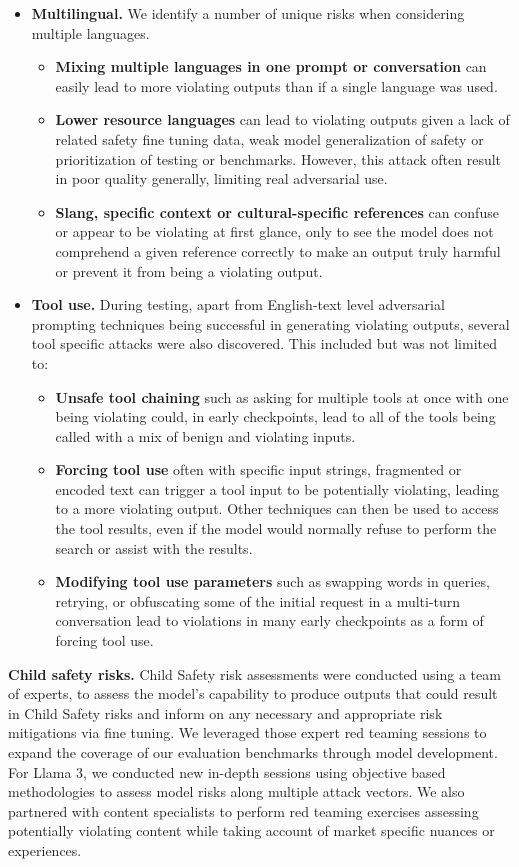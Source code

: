 \documentclass[dvipsnames]{fairmeta}
\begin{document}
\begin{itemize}
    \item \textbf{Multilingual.} We identify a number of unique risks when considering multiple languages.
    \begin{itemize}
        \item \textbf{Mixing multiple languages in one prompt or conversation} can easily lead to more violating outputs than if a single language was used.
        \item \textbf{Lower resource languages} can lead to violating outputs given a lack of related safety fine tuning data, weak model generalization of safety or prioritization of testing or benchmarks. However, this attack often result in poor quality generally, limiting real adversarial use.
        \item \textbf{Slang, specific context or cultural-specific references} can confuse or appear to be violating at first glance, only to see the model does not comprehend a given reference correctly to make an output truly harmful or prevent it from being a violating output.
    \end{itemize}

    \item \textbf{Tool use.} During testing, apart from English-text level adversarial prompting techniques being successful in generating violating outputs, several tool specific attacks were also discovered. This included but was not limited to:
    \begin{itemize}
        \item \textbf{Unsafe tool chaining} such as asking for multiple tools at once with one being violating could, in early checkpoints, lead to all of the tools being called with a mix of benign and violating inputs.
        \item \textbf{Forcing tool use} often with specific input strings, fragmented or encoded text can trigger a tool input to be potentially violating, leading to a more violating output. Other techniques can then be used to access the tool results, even if the model would normally refuse to perform the search or assist with the results.
        \item \textbf{Modifying tool use parameters} such as swapping words in queries, retrying, or obfuscating some of the initial request in a multi-turn conversation lead to violations in many early checkpoints as a form of forcing tool use.
    \end{itemize}
\end{itemize}

\textbf{Child safety risks.}
Child Safety risk assessments were conducted using a team of experts, to assess the model’s capability to produce outputs that could result in Child Safety risks and inform on any necessary and appropriate risk mitigations via fine tuning. We leveraged those expert red teaming sessions to expand the coverage of our evaluation benchmarks through model development. For Llama 3, we conducted new in-depth sessions using objective based methodologies to assess model risks along multiple attack vectors. We also partnered with content specialists to perform red teaming exercises assessing potentially violating content while taking account of market specific nuances or experiences.
\end{document}
